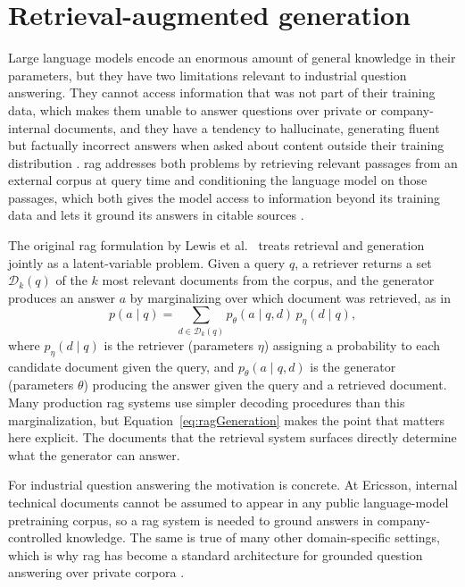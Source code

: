 \documentclass[english, bibtex]{kththesis}               %
\numberwithin{listing}{chapter}
\begin{document}
\section{Retrieval-augmented generation}
\label{sec:backgroundRag}

Large language models encode an enormous amount of general knowledge in their parameters, but they have two limitations relevant to industrial question answering. They cannot access information that was not part of their training data, which makes them unable to answer questions over private or company-internal documents, and they have a tendency to hallucinate, generating fluent but factually incorrect answers when asked about content outside their training distribution \cite{gao2023ragsurvey}. \Gls{rag} addresses both problems by retrieving relevant passages from an external corpus at query time and conditioning the language model on those passages, which both gives the model access to information beyond its training data and lets it ground its answers in citable sources \cite{gao2023ragsurvey,lewis2020rag}.

The original \gls{rag} formulation by Lewis et al.\ \cite{lewis2020rag} treats retrieval and generation jointly as a latent-variable problem. Given a query \(q\), a retriever returns a set \(\mathcal{D}_k(q)\) of the \(k\) most relevant documents from the corpus, and the generator produces an answer \(a\) by marginalizing over which document was retrieved, as in
\begin{equation}
\label{eq:ragGeneration}
p(a \mid q) =
\sum_{d \in \mathcal{D}_k(q)}
p_\theta(a \mid q,d)\,p_\eta(d \mid q),
\end{equation}
where \(p_\eta(d \mid q)\) is the retriever (parameters \(\eta\)) assigning a probability to each candidate document given the query, and \(p_\theta(a \mid q, d)\) is the generator (parameters \(\theta\)) producing the answer given the query and a retrieved document. Many production \gls{rag} systems use simpler decoding procedures than this marginalization, but Equation~\ref{eq:ragGeneration} makes the point that matters here explicit. The documents that the retrieval system surfaces directly determine what the generator can answer.

For industrial question answering the motivation is concrete. At Ericsson, internal technical documents cannot be assumed to appear in any public language-model pretraining corpus, so a \gls{rag} system is needed to ground answers in company-controlled knowledge. The same is true of many other domain-specific settings, which is why \gls{rag} has become a standard architecture for grounded question answering over private corpora \cite{gao2023ragsurvey}.
\end{document}

